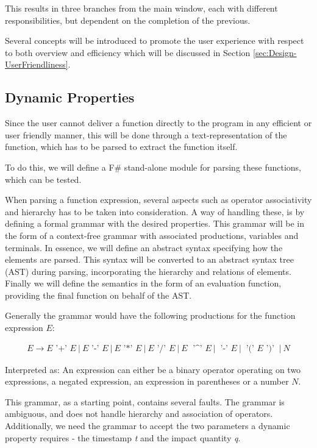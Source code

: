 \vspace{1 cm}
This results in three branches from the main window, each with different responsibilities, but dependent on the completion of the previous. 

Several concepts will be introduced to promote the user experience with respect to both overview and efficiency which will be discussed in Section \ref{sec:Design-UserFriendliness}.

\subsection{Dynamic Properties} \label{ssec:DynamicProperties}
Since the user cannot deliver a function directly to the program in any efficient or user friendly manner, this will be done through a text-representation of the function, which has to be parsed to extract the function itself. 

To do this, we will define a F\# stand-alone module for parsing these functions, which can be tested.

When parsing a function expression, several aspects such as operator associativity and hierarchy has to be taken into consideration. A way of handling these, is by defining a formal grammar with the desired properties. This grammar will be in the form of a context-free grammar with associated productions, variables and terminals. In essence, we will define an abstract syntax specifying how the elements are parsed. This syntax will be converted to an abstract syntax tree (AST) during parsing, incorporating the hierarchy and relations of elements. Finally we will define the semantics in the form of an evaluation function, providing the final function on behalf of the AST.

Generally the grammar would have the following productions for the function expression $E$:

\newcommand{\pipe}{\: | \:}

\begin{gather*}
E \rightarrow E \text{ '+' } E \pipe E \text{ '-' } E \pipe E \text{ '*' } E \pipe E \text{ '/' } E \pipe E \; \text{ '\textasciicircum' } E \pipe \text{ '-' }E \pipe \textit{ '(' } E \text{ ')' } \pipe N
\end{gather*}

Interpreted as: An expression can either be a binary operator operating on two expressions, a negated expression, an expression in parentheses or a number $N$.

This grammar, as a starting point, contains several faults. The grammar is ambiguous, and does not handle hierarchy and association of operators. Additionally, we need the grammar to accept the two parameters a dynamic property requires - the timestamp \textit{t} and the impact quantity \textit{q}. 

